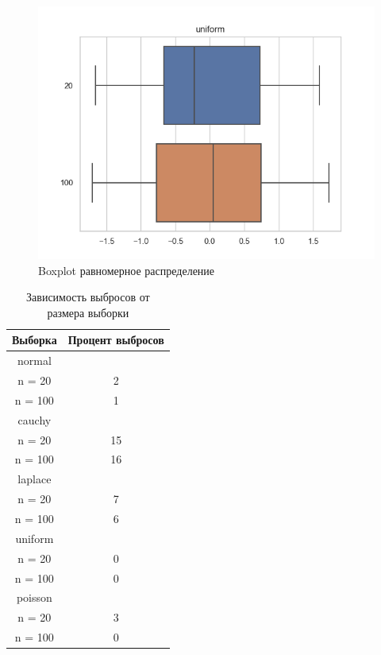 \documentclass[a4]{article}
\begin{document}
\begin{center}
\begin{figure}[H]
 \caption{Boxplot равномерное распределение }
\includegraphics[width=\textwidth]{uniform.png}
\end{figure}

\begin{table}[H]
    
    \caption{Зависимость выбросов от размера выборки}
    \label{tab:my_label}
    \begin{center}
    \vspace{5mm}
    \begin{tabular}{|c|c|}
    \hline
    Выборка & Процент выбросов\\
    \hline
         normal	&\\
         \hline
n = 20   & 	2    \\
\hline
n = 100   &	1    \\
	\hline
cauchy	&\\
\hline
n = 20   & 	15    \\
\hline
n = 100  & 	16    \\
	\hline
laplace	&\\
\hline
n = 20    &	7    \\
\hline
n = 100   &	6    \\
	\hline
uniform	&\\
\hline
n = 20    &	0    \\
\hline
n = 100   &	0   \\ 
	\hline
poisson	&\\
\hline
n = 20   & 	3    \\
\hline
n = 100  & 	0    \\
\hline
    \end{tabular}
    
    \end{center}
    
\end{table}

\end{center}
\end{document}
